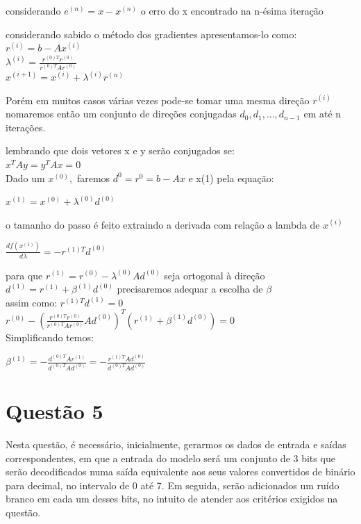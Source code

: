 \documentclass[a4paper, 12pt]{article}
\begin{document}
considerando $e^{(n)}=x-x^{(n)}$ o erro do x encontrado na n-ésima iteração
 
considerando sabido o método dos gradientes apresentamos-lo como:\\

$r^{(i)} = b- Ax^{(i)} $\\

$\lambda^{(i)}=\frac{r^{(0)T} r^{(0)} } {r^{(0)T}Ar^{(0)}}$\\

$x^{(i+1)}=x^{(i)}+\lambda^{(i)}r^{(n)}$    

Porém em muitos casos várias vezes pode-se tomar uma mesma direção $r^{(i)}$ nomaremos então um conjunto de direções conjugadas {$d_0,d_1,...,d_{n-1}$} em até n iterações.

lembrando que dois vetores x e y serão conjugados se:
\\

$x^TAy=y^TAx=0$\\

Dado um $x^{(0)},$ faremos $d^0=r^0=b-Ax$ e x(1) pela equação:

$x^{(1)}=x^{(0)}+\lambda^{(0)}d^{(0)}$

o tamanho do passo é feito extraindo a derivada com relação a lambda de $x^{(i)}$

$\frac{df(x^{(1)})}{d\lambda} = -r^{(1)T}d^{(0)} $

para que $r^{(1)}=r^{(0)}-\lambda^{(0)}Ad^{(0)}$ seja ortogonal à direção $d^{(1)} = r^{(1)}+\beta^{(1)}d^{(0)}$ precisaremos adequar a escolha de $\beta$\\

assim como: $r^{(1)T}d^{(1)}=0$\\

$r^{(0)}- (\frac{r^{(0)T}r^{(0)}}{r^{(0)T}Ar^{(0)}}Ad^{(0)})^T (r^{(1)}+\beta^{(1)}d^{(0)})=0$\\

Simplificando temos:

$\beta^{(1)} = -\frac{d^{(0)T}Ar^{(1)}}{d^{(0)T}Ad^{(0)}} = -\frac{r^{(1)T}Ad^{(0)}}{d^{(0)T}Ad^{(0)}}$




\section{Questão 5}

Nesta questão, é necessário, inicialmente, gerarmos os dados de entrada e saídas correspondentes, em que a entrada do modelo será um conjunto de 3 bits que serão decodificados numa saída equivalente aos seus valores convertidos de binário para decimal, no intervalo de 0 até 7. Em seguida, serão adicionados um ruído branco em cada um desses bits, no intuito de atender aos critérios exigidos na questão.
\end{document}
